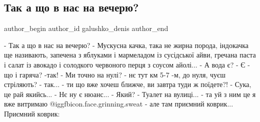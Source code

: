 
 
 
 
 

\subsection{Так а що в нас на вечерю?}
\label{sec:23_10_2022.fb.galushko_denis.1.tak_a_shcho_v_nas_na}

\ifcmt
 author_begin
   author_id galushko_denis
 author_end
\fi

\obeycr
- Так а що в нас на вечерю?
- Мускусна качка, така не жирна порода, індокачка ще називають, запечена з яблуками і мармеладом із сусідської айви, гречана паста і салат із авокадо і солодкого червоного перця з соусом айолі...
- А вода є?
- Є
- що і гаряча?
-так!
- Ми точно на нулі?
- нє тут км 5-7 -м, до нуля, чуєш стріляють?
- так...
- ти що вже хочеш ближче, ви завтра туди ж поїдете?!
- Сука, це рай якийсь...
- Нє ну є нюанс...
- Який?
- Туалет на вулиці...
- та уй з ним це я вже витримаю  @igg{fbicon.face.grinning.sweat} 
- але там приємний коврик...
Приємний коврик:
\restorecr
